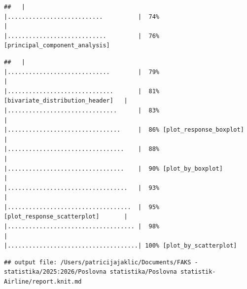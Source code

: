 \documentclass[
]{article}
\begin{document}
\begin{verbatim}
##   |                                             |...........................          |  74%                                   |                                             |............................         |  76% [principal_component_analysis]
\end{verbatim}

\begin{verbatim}
##   |                                             |.............................        |  79%                                   |                                             |..............................       |  81% [bivariate_distribution_header]   |                                             |...............................      |  83%                                   |                                             |................................     |  86% [plot_response_boxplot]           |                                             |.................................    |  88%                                   |                                             |.................................    |  90% [plot_by_boxplot]                 |                                             |..................................   |  93%                                   |                                             |...................................  |  95% [plot_response_scatterplot]       |                                             |.................................... |  98%                                   |                                             |.....................................| 100% [plot_by_scatterplot]           
\end{verbatim}

\begin{verbatim}
## output file: /Users/patricijajaklic/Documents/FAKS - statistika/2025:2026/Poslovna statistika/Poslovna statistik- Airline/report.knit.md
\end{verbatim}
\end{document}
